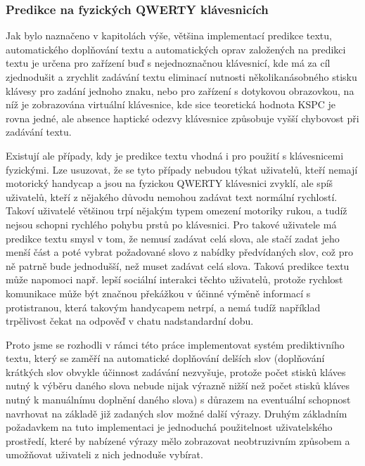 \documentclass{article}
\begin{document}
\subsubsection{Predikce na fyzických QWERTY klávesnicích}


Jak bylo naznačeno v kapitolách výše, většina implementací predikce textu, automatického doplňování textu a automatických oprav založených na predikci textu je určena pro zařízení buď s nejednoznačnou klávesnicí, kde má za cíl zjednodušit a zrychlit zadávání textu eliminací nutnosti několikanásobného stisku klávesy pro zadání jednoho znaku, nebo pro zařízení s dotykovou obrazovkou, na níž je zobrazována virtuální klávesnice, kde sice teoretická hodnota KSPC je rovna jedné, ale absence haptické odezvy klávesnice způsobuje vyšší chybovost při zadávání textu. 

Existují ale případy, kdy je predikce textu vhodná i pro použití s klávesnicemi fyzickými. Lze usuzovat, že se tyto případy nebudou týkat uživatelů, kteří nemají motorický handycap a jsou na fyzickou QWERTY klávesnici zvyklí, ale spíš uživatelů, kteří z nějakého důvodu nemohou zadávat text normální rychlostí. Takoví uživatelé většinou trpí nějakým typem omezení motoriky rukou, a tudíž nejsou schopni rychlého pohybu prstů po klávesnici. Pro takové uživatele má predikce textu smysl v tom, že nemusí zadávat celá slova, ale stačí zadat jeho menší část a poté vybrat požadované slovo z nabídky předvídaných slov, což pro ně patrně bude jednodušší, než muset zadávat celá slova. Taková predikce textu může napomoci např. lepší sociální interakci těchto uživatelů, protože rychlost komunikace může být značnou překážkou v účinné výměně informací s protistranou, která takovým handycapem netrpí, a nemá tudíž například trpělivost čekat na odpověď v chatu nadstandardní dobu. %


Proto jsme se rozhodli v rámci této práce implementovat systém prediktivního textu, který se zaměří na automatické doplňování delších slov (doplňování krátkých slov obvykle účinnost zadávání nezvyšuje, protože počet stisků kláves nutný k výběru daného slova nebude nijak výrazně nižší než počet stisků kláves nutný k manuálnímu doplnění daného slova) s důrazem na eventuální schopnost navrhovat na základě již zadaných slov možné další výrazy. Druhým základním požadavkem na tuto implementaci je jednoduchá použitelnost uživatelského prostředí, které by nabízené výrazy mělo zobrazovat neobtruzivním způsobem a umožňovat uživateli z nich jednoduše vybírat.
\end{document}
